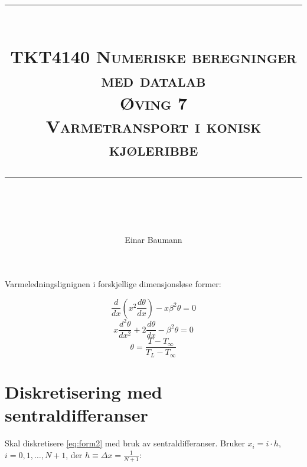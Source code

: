 




\author{Einar Baumann}
\title{
    \vspace{-1in}
    \vspace{0.1in}
    \rule{\textwidth}{0.5pt} \\[0.5cm]
    \normalfont \normalsize \textsc{TKT4140 Numeriske beregninger med datalab} \\ [20pt]
    {\textsc{ \huge Øving 7 }} \\ [0.5cm]
    {\textsc {\Large Varmetransport i konisk kjøleribbe} } \\
    \vspace{0.1in}
    \rule{\textwidth}{2pt} \\[0.7cm]
}


\maketitle
\thispagestyle{empty}
\clearpage


Varmeledningslignignen i forskjellige dimensjonsløse former:

\begin{equation}
  \frac{d}{dx} \left( x^2 \frac{d\theta}{dx} \right) - x \beta^2 \theta = 0 \label{eq:form1}
\end{equation}
\begin{equation}
  x \frac{d^2 \theta}{dx^2} + 2 \frac{d\theta}{dx} - \beta^2 \theta = 0 \label{eq:form2}
\end{equation}
\begin{equation}
  \theta = \frac{T-T_\infty}{T_L - T_\infty} \label{eq:theta_def}
\end{equation}


\section{Diskretisering med sentraldifferanser} %
\label{sec:diskretisering_med_sentraldifferanser}

Skal diskretisere \eqref{eq:form2} med bruk av sentraldifferanser. Bruker $x_i = i\cdot h$, $i=0,1,\dots , N+1$, der $h\equiv \Delta x = \frac{1}{N+1}$:

